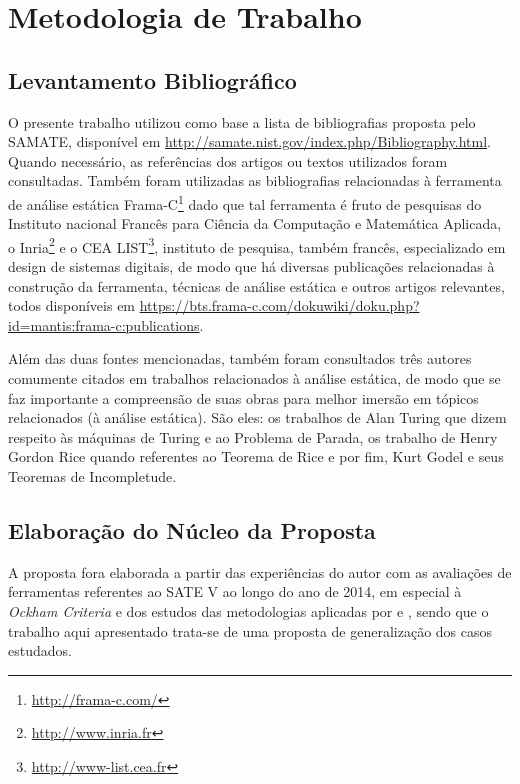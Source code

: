 \chapter{Metodologia de Trabalho}\label{metodologia}

\section{Levantamento Bibliográfico}

O presente trabalho utilizou como base  a lista de bibliografias proposta pelo SAMATE, disponível em \url{http://samate.nist.gov/index.php/Bibliography.html}. Quando necessário, as referências dos artigos ou textos utilizados foram consultadas. Também foram utilizadas as bibliografias relacionadas à ferramenta de análise estática Frama-C\footnote{\url{http://frama-c.com/}} dado que tal ferramenta é fruto de pesquisas do Instituto nacional Francês para Ciência da Computação e Matemática Aplicada, o Inria\footnote{\url{http://www.inria.fr}} e o CEA LIST\footnote{\url{http://www-list.cea.fr}}, instituto de pesquisa, também francês, especializado em design de sistemas digitais, de modo que há diversas publicações relacionadas à construção da ferramenta, técnicas de análise estática e outros artigos relevantes, todos disponíveis em \url{https://bts.frama-c.com/dokuwiki/doku.php?id=mantis:frama-c:publications}.

Além das duas fontes mencionadas, também foram consultados três autores comumente citados em trabalhos relacionados à análise estática, de modo que se faz importante a compreensão de suas obras para melhor imersão em tópicos relacionados (à análise estática). São eles: os trabalhos de Alan Turing que dizem respeito às máquinas de Turing e ao Problema de Parada, os trabalho de Henry Gordon Rice quando referentes ao Teorema de Rice e por fim, Kurt Godel e seus Teoremas de Incompletude.

\section{Elaboração do Núcleo da Proposta}

A proposta fora elaborada a partir das experiências do autor com as avaliações de ferramentas referentes ao SATE V ao longo do ano de 2014, em especial à \textit{Ockham Criteria} e dos estudos das metodologias aplicadas por \cite{harvard} e \cite{nsa}, sendo que o trabalho aqui apresentado trata-se de uma proposta de generalização dos casos estudados.


